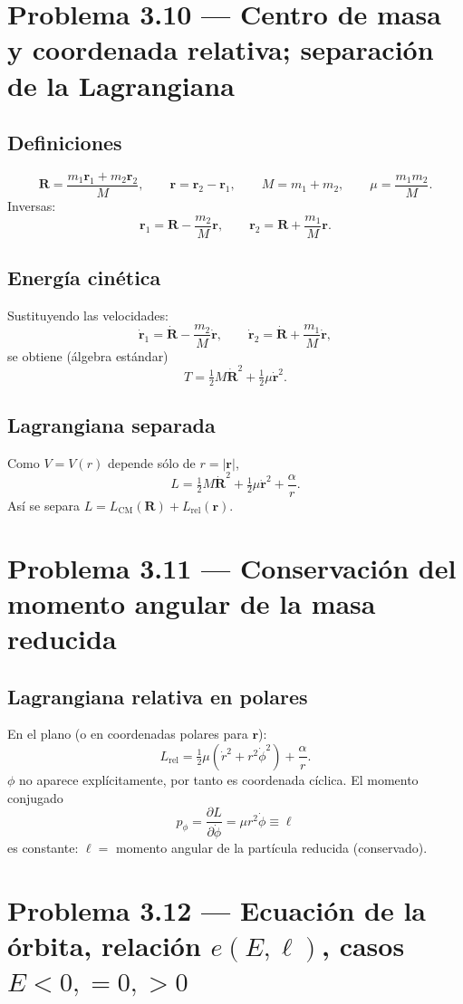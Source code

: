 \documentclass[12pt]{article}
\begin{document}
\section*{Problema 3.10 — Centro de masa y coordenada relativa; separación de la Lagrangiana}
\subsection*{Definiciones}
\[
\mathbf R = \frac{m_1\mathbf r_1 + m_2\mathbf r_2}{M},\qquad
\mathbf r = \mathbf r_2 - \mathbf r_1,\qquad
M=m_1+m_2,\qquad \mu=\frac{m_1m_2}{M}.
\]
Inversas:
\[
\mathbf r_1 = \mathbf R - \frac{m_2}{M}\mathbf r,\qquad
\mathbf r_2 = \mathbf R + \frac{m_1}{M}\mathbf r.
\]

\subsection*{Energía cinética}
Sustituyendo las velocidades:
\[
\dot{\mathbf r}_1 = \dot{\mathbf R} - \frac{m_2}{M}\dot{\mathbf r},\qquad
\dot{\mathbf r}_2 = \dot{\mathbf R} + \frac{m_1}{M}\dot{\mathbf r},
\]
se obtiene (álgebra estándar)
\[
T=\tfrac12 M\dot{\mathbf R}^2 + \tfrac12 \mu\dot{\mathbf r}^2.
\]

\subsection*{Lagrangiana separada}
Como \(V=V(r)\) depende sólo de \(r=|\mathbf r|\),
\[
\boxed{L = \tfrac12 M\dot{\mathbf R}^2 + \tfrac12 \mu\dot{\mathbf r}^2 + \frac{\alpha}{r}.}
\]
Así se separa \(L=L_{\text{CM}}(\mathbf R)+L_{\text{rel}}(\mathbf r)\).

\section*{Problema 3.11 — Conservación del momento angular de la masa reducida}
\subsection*{Lagrangiana relativa en polares}
En el plano (o en coordenadas polares para \(\mathbf r\)):
\[
L_{\text{rel}} = \tfrac12\mu(\dot r^2 + r^2\dot\phi^2) + \frac{\alpha}{r}.
\]
\(\phi\) no aparece explícitamente, por tanto es coordenada cíclica. El momento conjugado
\[
p_\phi = \frac{\partial L}{\partial\dot\phi} = \mu r^2\dot\phi \equiv \ell
\]
es constante: \(\ell=\) momento angular de la partícula reducida (conservado).

\section*{Problema 3.12 — Ecuación de la órbita, relación \(e(E,\ell)\), casos \(E<0,=0,>0\)}
\end{document}
